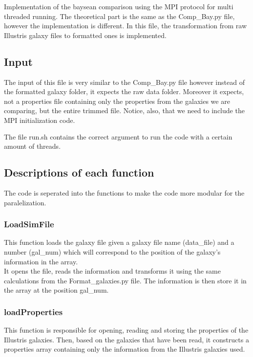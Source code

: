\documentclass[11pt]{article}
\begin{document}
Implementation of the baysean comparison using the MPI protocol for multi threaded running. The theoretical part is the same as the Comp\_Bay.py file, however the implementation is different. In this file, the transformation from raw Illustris galaxy files to formatted ones is implemented.\\

\subsection{Input}

The input of this file is very similar to the Comp\_Bay.py file however instead of the formatted galaxy folder, it expects the raw data folder. Moreover it expects, not a properties file containing only the properties from the galaxies we are comparing, but the entire trimmed file. Notice, also, that we need to include the MPI initialization code.

The file run.sh contains the correct argument to run the code with a certain amount of threads.

\subsection{Descriptions of each function}

The code is seperated into the functions to make the code more modular for the paralelization.


\subsubsection{LoadSimFile}

This function loads the galaxy file given a galaxy file name (data\_file) and a number (gal\_num) which will correspond to the position of the galaxy's information in the array.\\

It opens the file, reads the information and transforms it using the same calculations from the Format\_galaxies.py file. The information is then store it in the array at the position gal\_num.

\subsubsection{loadProperties}

This function is responsible for opening, reading and storing the properties of the Illustris galaxies. Then, based on the galaxies that have been read, it constructs a properties array containing only the information from the Illustris galaxies used.
\end{document}
